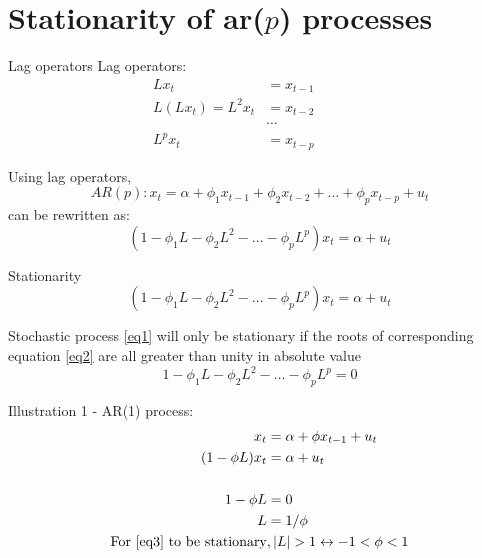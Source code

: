 \documentclass{beamer}
\begin{document}
\section{Stationarity of ar($p$) processes}

\begin{frame}{Lag operators}
Lag operators:
\begin{align*}
Lx_t &= x_{t-1} \\
L(Lx_t)=L^2x_t &= x_{t-2} ~~~~~~~~~~~~~~~~~\\
&\cdots \\
L^p x_t &= x_{t-p} 
\end{align*}

Using lag operators,
$$ AR(p):  x_t = \alpha + \phi_1 x_{t-1} + \phi_2 x_{t-2} +\dots + \phi_p
  x_{t-p}+u_t$$
can be rewritten as: 
$$(1-\phi_1 L - \phi_2 L^2 - \dots - \phi_p L^p)x_t = \alpha + u_t $$

\end{frame}


\begin{frame}{Stationarity}
\vspace{-0.5cm}
\begin{equation} \label{eq1}
(1-\phi_1 L - \phi_2 L^2 - \dots - \phi_p L^p)x_t = \alpha + u_t
\end{equation}

Stochastic process \eqref{eq1} will only be stationary if the roots of corresponding equation \eqref{eq2}  are all greater than unity in absolute value 
\vspace{-0.5cm}
\begin{equation} \label{eq2}
1-\phi_1 L - \phi_2 L^2 - \dots - \phi_p L^p = 0
\end{equation}
\vspace{-0.5cm}
\begin{block}{Illustration 1 - AR(1) process:}
\vspace{-0.5cm}
\begin{align}
\vspace{-0.5cm}
x_t & =  \alpha + \phi x_{t-1} + u_t \label{eq3}  \\ \nonumber
(1-\phi L) x_t & =  \alpha + u_t\\ \nonumber
~ \\ \nonumber
1- \phi L & = 0 \\ \nonumber
L & = 1/\phi \\ \nonumber
\textnormal{For \eqref{eq3} to be stationary} &, \textnormal{$|L|>1 \leftrightarrow -1 < \phi < 1$}
\end{align}
\end{block}

\end{frame}
\end{document}
